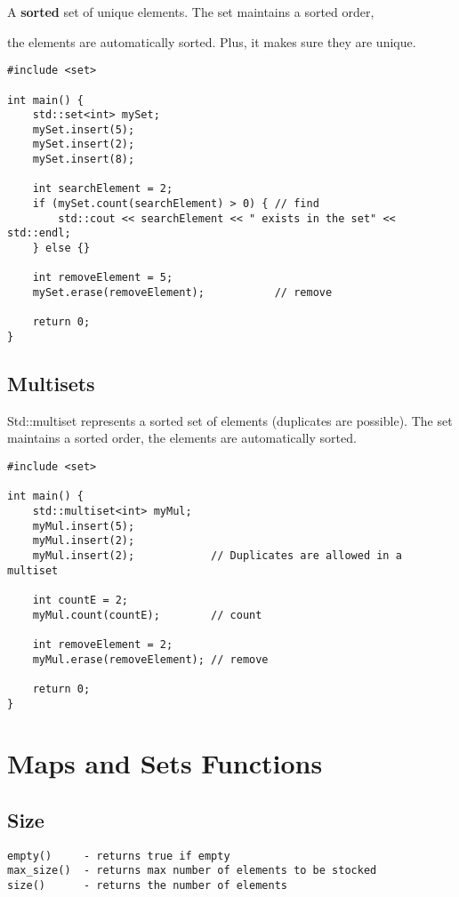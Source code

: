A \textbf{sorted} set of unique elements. The set maintains a sorted order,

the elements are automatically sorted. Plus, it makes sure they are unique.

\begin{verbatim}
#include <set>

int main() {
    std::set<int> mySet;
    mySet.insert(5);
    mySet.insert(2);
    mySet.insert(8);

    int searchElement = 2;
    if (mySet.count(searchElement) > 0) { // find
        std::cout << searchElement << " exists in the set" << std::endl;
    } else {}

    int removeElement = 5;
    mySet.erase(removeElement);           // remove

    return 0;
}
\end{verbatim}

\subsection{Multisets}

Std::multiset represents a sorted set of elements (duplicates are possible). The set maintains a sorted order,
the elements are automatically sorted.

\begin{verbatim}
#include <set>

int main() {
    std::multiset<int> myMul;
    myMul.insert(5);
    myMul.insert(2);
    myMul.insert(2);            // Duplicates are allowed in a multiset

    int countE = 2;
    myMul.count(countE);        // count

    int removeElement = 2;
    myMul.erase(removeElement); // remove

    return 0;
}
\end{verbatim}

\section{Maps and Sets Functions}

\subsection{Size}

\begin{verbatim}
empty()     - returns true if empty
max_size()  - returns max number of elements to be stocked
size()      - returns the number of elements
\end{verbatim}

